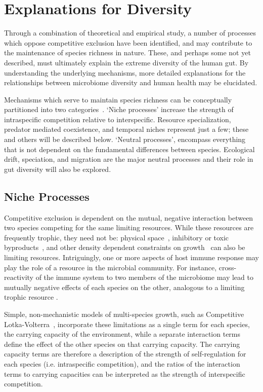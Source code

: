 \documentclass[12pt]{article}
\begin{document}
\section{Explanations for Diversity}
Through a combination of theoretical and empirical study, a number of
processes which oppose competitive exclusion have been identified,
and may contribute to the maintenance of species richness in nature.
These, and perhaps some not yet described,
must ultimately explain the extreme diversity of the human gut.
By understanding the underlying mechanisms,
more detailed explanations for the relationships between microbiome
diversity and human health may be elucidated.

Mechanisms which serve to maintain species richness can be conceptually
partitioned into two categories~\citep{Vellend2010}.
`Niche processes' increase the strength of intraspecific competition
relative to interspecific.
Resource specialization, predator mediated coexistence, and temporal niches
represent just a few;
these and others will be described below.
`Neutral processes', encompass everything that is not dependent on the
fundamental differences between species.
Ecological drift, speciation, and migration are the major neutral processes
and their role in gut diversity will also be explored.

\subsection{Niche Processes}
Competitive exclusion is dependent on the mutual, negative interaction
between two species competing for the same limiting resources.
While these resources are frequently trophic, they need not be:
physical space~\citep{Hastings1980,TODO}, inhibitory or toxic byproducts~\citep{TODO},
and other density dependent constraints on growth~\citep{TODO}
can also be limiting resources.
Intriguingly, one or more aspects of host immune response may
play the role of a resource in the microbial community.
For instance, cross-reactivity of the immune system to two members
of the microbiome may lead to mutually negative effects of each
species on the other, analogous to a limiting trophic resource
\citep[For a review of the interaction of the microbiota with the immune system:][]{Brestoff2013}.

Simple, non-mechanistic models of multi-species growth,
such as Competitive Lotka-Volterra~\citep{Lotka1925,Volterra1928},
incorporate these limitations as a single term for each species,
the carrying capacity of the environment,
while a separate interaction terms define the effect of the other species
on that carrying capacity.
The carrying capacity terms are therefore a description of the strength
of self-regulation for each species
(i.e\@. intraspecific competition),
and the ratios of the interaction terms to carrying capacities can
be interpreted as the strength of interspecific competition.
\end{document}
